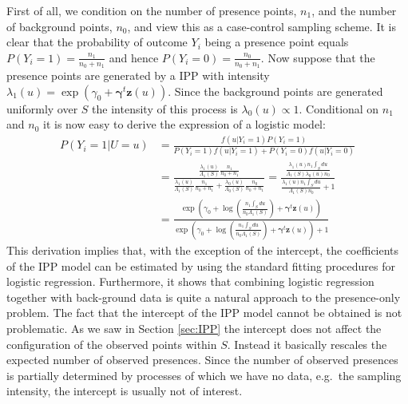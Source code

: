 First of all, we condition on the number of presence points, $n_1$, and the number of background points, $n_0$, and view this as a case-control sampling scheme. It is clear that the probability of outcome $Y_i$ being a presence point equals $P(Y_i = 1) = \frac{n_1}{n_0 + n_1}$ and hence $P(Y_i = 0) = \frac{n_0}{n_0 + n_1}$. Now suppose that the presence points are generated by a IPP with intensity $\lambda_1(u) = \exp(\gamma_0 + \bm{\gamma}^t\bm{z}(u))$. Since the background points are generated uniformly over $S$ the intensity of this process is $\lambda_0(u) \propto 1.$ Conditional on $n_1$ and $n_0$ it is now easy to derive the expression of a logistic model:
\begin{equation}
\begin{aligned}
P(Y_i = 1 | U = u) & = \frac{f(u|Y_i = 1) P(Y_i = 1)}{P(Y_i = 1) f(u|Y_i = 1) + P(Y_i = 0)f(u|Y_i = 0) } \\[0.5ex]
 & = \frac{\frac{\lambda_1(u)}{\Lambda_1(S)}\frac{n_1}{n_0 + n_1}}{\frac{\lambda_1(u)}{\Lambda_1(S)}\frac{n_1}{n_0 + n_1} + \frac{\lambda_0(u)}{\Lambda_0(S)}\frac{n_0}{n_0 + n_1}} 
 = \frac{\frac{\lambda_1(u) n_1 \int_S du }{\Lambda_1(S)\lambda_0(u) n_0}}{\frac{ \lambda_1(u) n_1 \int_S du}{\Lambda_1(S) n_0} + 1} \\[0.5ex]
 & = \frac{\exp \left( \gamma_0 + \log \left( \frac{n_1 \int_S du }{n_0\Lambda_1(S)}\right) + \bm{\gamma}^t\bm{z}(u) \right)}{\exp \left( \gamma_0 + \log \left( \frac{n_1 \int_S du }{n_0\Lambda_1(S)}\right) + \bm{\gamma}^t\bm{z}(u) \right) + 1}
\end{aligned}
\end{equation}
This derivation implies that, with the exception of the intercept, the coefficients of the IPP model can be estimated by using the standard fitting procedures for logistic regression. Furthermore, it shows that combining logistic regression together with back-ground data is quite a natural approach to the presence-only problem. The fact that the intercept of the IPP model cannot be obtained is not problematic. As we saw in Section \ref{sec:IPP} the intercept does not affect the configuration of the observed points within $S$. Instead it basically rescales the expected number of observed presences. Since the number of observed presences is partially determined by processes of which we have no data, e.g.\ the sampling intensity, the intercept is usually not of interest.


